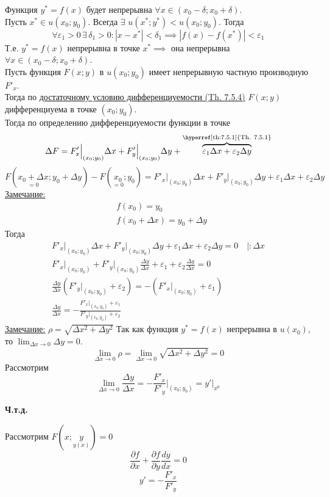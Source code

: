 \documentclass[12pt]{article}
\begin{document}
\begin{adjustwidth}{1.5em}{1.5em}
        Функция $y^* = f(x)$ будет непрерывна $\forall x \in (x_0 - \delta; x_0 + \delta)$.\\
        Пусть $x^* \in u(x_0; y_0)$. Всегда $\exists$ $u(x^*; y^*) < u(x_0; y_0)$. Тогда
        \[ \forall \varepsilon_1 > 0\, \exists\, \delta_1 > 0 : |x - x^*| < \delta_1 \implies | f(x) - f(x^*)| < \varepsilon_1 \]
        Т.е. $y^* = f(x)$ непрерывна в точке $x^* \implies$ она непрерывна $\forall x \in (x_0 - \delta; x_0 + \delta)$.\\
        Пусть функция $F(x; y)$ в $u(x_0; y_0)$ имеет непрерывную частную производную $F'_x$.\\
        Тогда по \hyperref[th:7.5.4]{достаточному условию дифференциуемости (Th. 7.5.4)} $F(x; y)$ дифференциуема в точке $(x_0; y_0)$.\\
        Тогда по определению дифференциуемости функции в точке
        \[ \Delta F = F'_x \Big|_{(x_0; y_0)} \Delta x + F'_y \Big|_{(x_0; y_0)} \Delta y + \overbrace{\varepsilon_1 \Delta x + \varepsilon_2 \Delta y}^{\text{\hyperref[th:7.5.1]{Th. 7.5.1}}} \]
        \[ F(\underset{=0}{x_0 + \Delta x}; y_0 + \Delta y) - F(\underset{=0}{x_0}; y_0) = F'_x \Big|_{(x_0; y_0)} \Delta x + F'_y \Big|_{(x_0; y_0)} \Delta y + \varepsilon_1 \Delta x + \varepsilon_2 \Delta y \]
        \underline{Замечание:} 
        \[ \begin{aligned}
            &f(x_0) = y_0\\
            &f(x_0 + \Delta x) = y_0 + \Delta y
        \end{aligned} \]
        Тогда
        \begin{gather*}
            F'_x \Big|_{(x_0; y_0)} \Delta x + F'_y \Big|_{(x_0; y_0)} \Delta y + \varepsilon_1 \Delta x + \varepsilon_2 \Delta y = 0 \quad \Big| : \Delta x\\
            F'_x \Big|_{(x_0; y_0)} + F'_y \Big|_{(x_0; y_0)} \frac{\Delta y}{\Delta x} + \varepsilon_1 + \varepsilon_2 \frac{\Delta y}{\Delta x} = 0\\
            \frac{\Delta y}{\Delta x} \left( F'_y \Big|_{(x_0; y_0)} + \varepsilon_2 \right) = - \left( F'_x \Big|_{(x_0; y_0)} + \varepsilon_1 \right)\\
            \frac{\Delta y}{\Delta x} = - \frac{F'_x \Big|_{(x_0; y_0)} + \varepsilon_1}{F'_y \Big|_{(x_0; y_0)} + \varepsilon_2}
        \end{gather*}
        \underline{Замечание:} $\rho = \sqrt{\Delta x^2 + \Delta y^2}$
        Так как функция $y^* = f(x)$ непрерывна в $u(x_0)$, то $\lim_{\Delta x \to 0} \Delta y = 0$.
        \[
            \lim_{\Delta x \to 0}\rho = \lim_{\Delta x \to 0} \sqrt{\Delta x^2 + \Delta y^2} = 0
        \]
        Рассмотрим
        \[ \lim_{\Delta x \to 0} \frac{\Delta y}{\Delta x} = \boxed{ - \frac{F'_x}{F'_y} \Big|_{(x_0; y_0)} = y' \Big|_{x^0} } \]
        \begin{center}
            \textbf{Ч.т.д.}
        \end{center}
    \end{adjustwidth}
    Рассмотрим $F(x; \underset{y(x)}{y}) = 0$
    \[ \frac{\partial f}{\partial x} + \frac{\partial f}{\partial y} \frac{dy}{dx} = 0 \]
    \[ y' = - \frac{F'_x}{F'_y} \]
\end{document}
